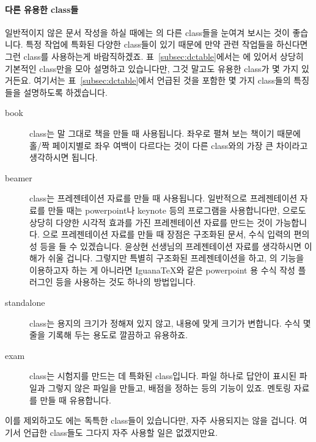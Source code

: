 \paragraph{다른 유용한 class들}
일반적이지 않은 문서 작성을 하실 때에는 \lt 의 다른 class들을 눈여겨 보시는 것이 좋습니다.
특정 작업에 특화된 다양한 class들이 있기 때문에 만약 관련 작업들을 하신다면 그런 class를 사용하는게 바람직하겠죠. 표~\ref{subsec:dctable}에서는 \lt 에 있어서 상당히 기본적인 class만을 모아 설명하고 있습니다만, 그것 말고도 유용한 class가 몇 가지 있거든요. 여기서는 표~\ref{subsec:dctable}에서 언급된 것을 포함한 몇 가지 class들의 특징들을 설명하도록 하겠습니다.
\begin{description}
\item[book] class는 말 그대로 책을 만들 때 사용됩니다. 좌우로 펼쳐 보는 책이기 때문에 홀/짝 페이지별로 좌우 여백이 다르다는 것이 다른 class와의 가장 큰 차이라고 생각하시면 됩니다.
\item[beamer] class는 프레젠테이션 자료를 만들 때 사용됩니다. 일반적으로 프레젠테이션 자료를 만들 때는 powerpoint나 keynote 등의 프로그램을 사용합니다만, \lt 으로도 상당히 다양한 시각적 효과를 가진 프레젠테이션 자료를 만드는 것이 가능합니다. \lt 으로 프레젠테이션 자료를 만들 때 장점은 구조화된 문서, 수식 입력의 편의성 등을 들 수 있겠습니다. 윤상현 선생님의 프레젠테이션 자료를 생각하시면 이해가 쉬울 겁니다. 그렇지만 특별히 구조화된 프레젠테이션을 하고, \lt 의 기능을 이용하고자 하는 게 아니라면 IguanaTeX와 같은 powerpoint 용 \lt 수식 작성 플러그인 등을 사용하는 것도 하나의 방법입니다.
\item[standalone] class는 용지의 크기가 정해져 있지 않고, 내용에 맞게 크기가 변합니다. 수식 몇 줄을 기록해 두는 용도로 깔끔하고 유용하죠.
\item[exam] class는 시험지를 만드는 데 특화된 class입니다. 파일 하나로 답안이 표시된 파일과 그렇지 않은 파일을 만들고, 배점을 정하는 등의 기능이 있죠. 멘토링 자료를 만들 때 유용합니다.
\end{description}
이를 제외하고도 \lt 에는 독특한 class들이 있습니다만, 자주 사용되지는 않을 겁니다.
여기서 언급한 class들도 그다지 자주 사용할 일은 없겠지만요.

